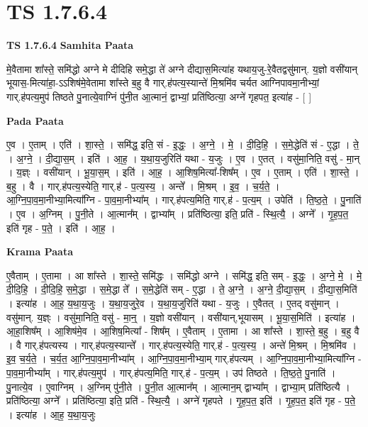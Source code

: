 \documentclass[17pt]{extarticle}
\begin{document}
\section{ TS 1.7.6.4 }

\textbf{TS 1.7.6.4 } \newline
\textbf{Samhita Paata} \newline

मे॒वैतामा शा᳚स्ते॒ समि॑द्धो अग्ने मे दीदिहि समे॒द्धा ते॑ अग्ने दीद्यास॒मित्या॑ह यथाय॒जु-रे॒वैतद्वसु॑मान्. य॒ज्ञो वसी॑यान् भूयास॒-मित्या॑हा॒-ऽऽशिष॑मे॒वेतामा शा᳚स्ते ब॒हु वै गार्.ह॑पत्य॒स्यान्ते॑ मि॒श्रमि॑व चर्यत आग्निपावमा॒नीभ्यां॒ गार्.ह॑पत्य॒मुप॑ तिष्ठते पु॒नात्ये॒वाग्निं पु॑नी॒त आ॒त्मानं॒ द्वाभ्यां॒ प्रति॑ष्ठित्या॒ अग्ने॑ गृहपत॒ इत्या॑ह - [ ] \newline

\textbf{Pada Paata} \newline

ए॒व । ए॒ताम् । एति॑ । शा॒स्ते॒ । समि॑द्ध॒ इति॒ सं - इ॒द्धः॒ । अ॒ग्ने॒ । मे॒ । दी॒दि॒हि॒ । स॒मे॒द्धेति॑ सं - ए॒द्धा । ते॒ । अ॒ग्ने॒ । दी॒द्या॒स॒म् । इति॑ । आ॒ह॒ । य॒था॒य॒जुरिति॑ यथा - य॒जुः । ए॒व । ए॒तत् । वसु॑मा॒निति॒ वसु॑ - मा॒न् । य॒ज्ञ्ः । वसी॑यान् । भू॒या॒स॒म् । इति॑ । आ॒ह॒ । आ॒शिष॒मित्या᳚-शिष᳚म् । ए॒व । ए॒ताम् । एति॑ । शा॒स्ते॒ । ब॒हु । वै । गार्.ह॑पत्य॒स्येति॒ गार्.ह॑ - प॒त्य॒स्य॒ । अन्ते᳚ । मि॒श्रम् । इ॒व॒ । च॒र्य॒ते॒ । आ॒ग्नि॒पा॒व॒मा॒नीभ्या॒मित्या᳚ग्नि - पा॒व॒मा॒नीभ्या᳚म् । गार्.ह॑पत्य॒मिति॒ गार्.ह॑ - प॒त्य॒म् । उपेति॑ । ति॒ष्ठ॒ते॒ । पु॒नाति॑ । ए॒व । अ॒ग्निम् । पु॒नी॒ते । आ॒त्मान᳚म् । द्वाभ्या᳚म् । प्रति॑ष्ठित्या॒ इति॒ प्रति॑ - स्थि॒त्यै॒ । अग्ने᳚ । गृ॒ह॒प॒त॒ इति॑ गृह - प॒ते॒ । इति॑ । आ॒ह॒ ।  \newline


\textbf{Krama Paata} \newline

ए॒वैताम् । ए॒तामा । आ शा᳚स्ते । शा॒स्ते॒ समि॑द्धः । समि॑द्धो अग्ने । समि॑द्ध॒ इति॒ सम् - इ॒द्धः॒ । अ॒ग्ने॒ मे॒ । मे॒ दी॒दि॒हि॒ । दी॒दि॒हि॒ स॒मे॒द्धा । स॒मे॒द्धा ते᳚ । स॒मे॒द्धेति॑ सम् - ए॒द्धा । ते॒ अ॒ग्ने॒ । अ॒ग्ने॒ दी॒द्या॒स॒म् । दी॒द्या॒स॒मिति॑ । इत्या॑ह । आ॒ह॒ य॒था॒य॒जुः । य॒था॒य॒जुरे॒व । य॒था॒य॒जुरिति॑ यथा - य॒जुः । ए॒वैतत् । ए॒तद् वसु॑मान् । वसु॑मान्. य॒ज्ञ्ः । वसु॑मा॒निति॒ वसु॑ - मा॒न्॒ । य॒ज्ञो वसी॑यान् । वसी॑यान्,भूयासम् । भू॒या॒स॒मिति॑ । इत्या॑ह । आ॒हा॒शिष᳚म् । आ॒शिष॑मे॒व । आ॒शिष॒मित्या᳚ - शिष᳚म् । ए॒वैताम् । ए॒तामा । आ शा᳚स्ते । शा॒स्ते॒ ब॒हु । ब॒हु वै । वै गार्.ह॑पत्यस्य । गार्.ह॑पत्य॒स्यान्ते᳚ । गार्.ह॑पत्य॒स्येति॒ गार्.ह॑ - प॒त्य॒स्य॒ । अन्ते॑ मि॒श्रम् । मि॒श्रमि॑व । इ॒व॒ च॒र्य॒ते॒ । च॒र्य॒त॒ आ॒ग्नि॒पा॒व॒मा॒नीभ्या᳚म् । आ॒ग्नि॒पा॒व॒मा॒नीभ्या॒म् गार्.ह॑पत्यम् । आ॒ग्नि॒पा॒व॒मा॒नीभ्या॒मित्या᳚ग्नि - पा॒व॒मा॒नीभ्या᳚म् । गार्.ह॑पत्य॒मुप॑ । गार्.ह॑पत्य॒मिति॒ गार्.ह॑ - प॒त्य॒म् । उप॑ तिष्ठते । ति॒ष्ठ॒ते॒ पु॒नाति॑ । पु॒नात्ये॒व । ए॒वाग्निम् । अ॒ग्निम् पु॑नी॒ते । पु॒नी॒त आ॒त्मान᳚म् । आ॒त्मान॒म् द्वाभ्या᳚म् । द्वाभ्या॒म् प्रति॑ष्ठित्यै । प्रति॑ष्ठित्या॒ अग्ने᳚ । प्रति॑ष्ठित्या॒ इति॒ प्रति॑ - स्थि॒त्यै॒ । अग्ने॑ गृहपते । गृ॒ह॒प॒त॒ इति॑ । गृ॒ह॒प॒त॒ इति॑ गृह - प॒ते॒ । इत्या॑ह । आ॒ह॒ य॒था॒य॒जुः \newline
\end{document}
